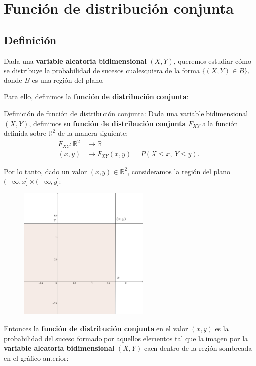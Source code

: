 \documentclass[]{book}
\begin{document}
\hypertarget{funciuxf3n-de-distribuciuxf3n-conjunta}{%
\section{Función de distribución conjunta}\label{funciuxf3n-de-distribuciuxf3n-conjunta}}

\hypertarget{definiciuxf3n-1}{%
\subsection{Definición}\label{definiciuxf3n-1}}

Dada una \textbf{variable aleatoria bidimensional} \((X,Y)\), queremos estudiar cómo se distribuye la probabilidad de sucesos cualesquiera de la forma \(\{(X,Y)\in B\}\), donde \(B\) es una región del plano.

Para ello, definimos la \textbf{función de distribución conjunta}:

Definición de función de distribución conjunta:
Dada una variable bidimensional \((X,Y)\), definimos su \textbf{función de distribución conjunta} \(F_{XY}\) a la función definida sobre \(\mathbb{R}^2\) de la manera siguiente:
\[
\begin{array}{rl}
F_{XY}: \mathbb{R}^2 & \longrightarrow \mathbb{R}\\
(x,y) & \longrightarrow F_{XY}(x,y)=P(X\leq x,\ Y\leq y).
\end{array}
\]

Por lo tanto, dado un valor \((x,y)\in \mathbb{R}^2\), consideramos la región del plano \((-\infty,x]\times (-\infty,y]\):

\begin{figure}
\includegraphics[width=2.5in]{Images/Fxy} \end{figure}

Entonces la \textbf{función de distribución conjunta} en el valor \((x,y)\) es la probabilidad del suceso formado por aquellos elementos tal que la imagen por la \textbf{variable aleatoria bidimensional} \((X,Y)\) caen dentro de la región sombreada en el gráfico anterior:
\end{document}
